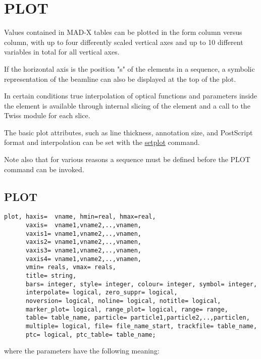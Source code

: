 
\chapter{PLOT}

Values contained in MAD-X tables can be plotted in the form column
versus column, with up to four differently scaled vertical axes and up
to 10 different variables in total for all vertical axes.

If the horizontal axis is the position "s" of the elements
in a sequence, a symbolic representation of the beamline can also
be displayed at the top of the plot. 

In certain conditions true interpolation of optical functions and
parameters inside the element is available through internal slicing of
the element and a call to the Twiss module for each slice. 

The basic plot attributes, such as line thickness, annotation size,
and PostScript format and interpolation can be set with the
\hyperlink{setplot}{setplot} command.   

Note also that for various reasons a sequence must be defined before the 
PLOT command can be invoked. 

\section{PLOT}	
\begin{verbatim}
plot, haxis=  vname, hmin=real, hmax=real, 
      vaxis=  vname1,vname2,..,vnamen,
      vaxis1= vname1,vname2,..,vnamen, 
      vaxis2= vname1,vname2,..,vnamen,
      vaxis3= vname1,vname2,..,vnamen, 
      vaxis4= vname1,vname2,..,vnamen,
      vmin= reals, vmax= reals, 
      title= string, 
      bars= integer, style= integer, colour= integer, symbol= integer, 
      interpolate= logical, zero_suppr= logical,
      noversion= logical, noline= logical, notitle= logical, 
      marker_plot= logical, range_plot= logical, range= range, 
      table= table_name, particle= particle1,particle2,..,particlen,
      multiple= logical, file= file_name_start, trackfile= table_name, 
      ptc= logical, ptc_table= table_name; 
\end{verbatim} 

where the parameters have the following meaning: 

